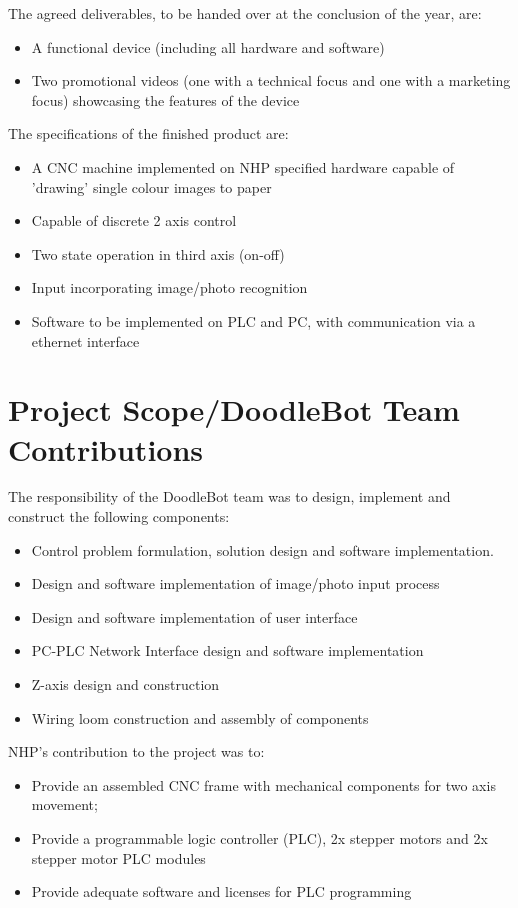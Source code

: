 The agreed deliverables, to be handed over at the conclusion of the year, are:
	\begin{itemize}
		\item A functional device (including all hardware and software)
		\item Two promotional videos (one with a technical focus and one with a marketing focus) showcasing the features of the device
	\end{itemize}	

The specifications of the finished product are:
	\begin{itemize}
		\item A CNC machine implemented on NHP specified hardware capable of 'drawing' single colour images to paper
		\item Capable of discrete 2 axis control
		\item Two state operation in third axis (on-off)
		\item Input incorporating image/photo recognition
		\item Software to be implemented on PLC and PC, with communication via a ethernet interface
	\end{itemize}

\section{Project Scope/DoodleBot Team Contributions}
The responsibility of the DoodleBot team was to design, implement and construct the following components:
	\begin{itemize}
		\item Control problem formulation, solution design and software implementation. 
		\item Design and software implementation of image/photo input process
		\item Design and software implementation of user interface
		\item PC-PLC Network Interface design and software implementation
		\item Z-axis design and construction
		\item Wiring loom construction and assembly of components
	\end{itemize}
	
NHP's contribution to the project was to:
	\begin{itemize}
		\item Provide an assembled CNC frame with mechanical components for two axis movement;
		\item Provide a programmable logic controller (PLC), 2x stepper motors and 2x stepper motor PLC modules
		\item Provide adequate software and licenses for PLC programming
	\end{itemize}


